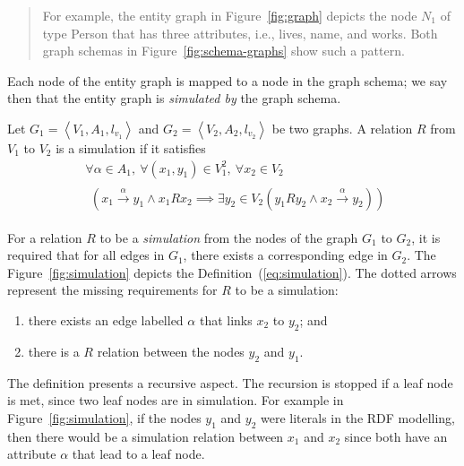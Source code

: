 \begin{quote}
	For example, the entity graph in Figure~\ref{fig:graph} depicts the node $N_1$ of type Person that has three attributes, i.e., lives, name, and works. Both graph schemas in Figure~\ref{fig:schema-graphs} show such a pattern.
\end{quote}

Each node of the entity graph is mapped to a node in the graph schema; we say then that the entity graph is \emph{simulated by} the graph schema.

\begin{definition}[Simulation]
	Let $G_1 = \left\langle V_1, A_1, l_{v_1} \right\rangle$ and $G_2 = \left\langle V_2, A_2, l_{v_2} \right\rangle$ be two graphs. A relation $R$ from $V_1$ to $V_2$ is a simulation if it satisfies
	\begin{equation*}
	\begin{split}
	& \forall \alpha \in A_1,\: \forall (x_1,y_1) \in V^2_1,\: \forall x_2 \in V_2 \\
	&\begin{aligned}
	\left(x_1 \overset{\alpha}{\rightarrow} y_1 \wedge x_1 R x_2 \implies \exists y_2 \in V_2 \left( y_1 R y_2 \wedge x_2 \overset{\alpha}{\rightarrow} y_2 \right) \right)
	\end{aligned}
	\end{split}
	\end{equation*}
	\label{eq:simulation}
\end{definition}

For a relation $R$ to be a \emph{simulation} from the nodes of the graph $G_1$ to $G_2$, it is required that for all edges in $G_1$, there exists a corresponding edge in $G_2$. The Figure~\ref{fig:simulation} depicts the Definition~(\ref{eq:simulation}). The dotted arrows represent the missing requirements for $R$ to be a simulation:
\begin{enumerate}
	\item there exists an edge labelled $\alpha$ that links $x_2$ to $y_2$; and
	\item there is a $R$ relation between the nodes $y_2$ and $y_1$.
\end{enumerate}
The definition presents a recursive aspect. The recursion is stopped if a leaf node is met, since two leaf nodes are in simulation. For example in Figure~\ref{fig:simulation}, if the nodes $y_1$ and $y_2$ were literals in the RDF modelling, then there would be a simulation relation between $x_1$ and $x_2$ since both have an attribute $\alpha$ that lead to a leaf node.

